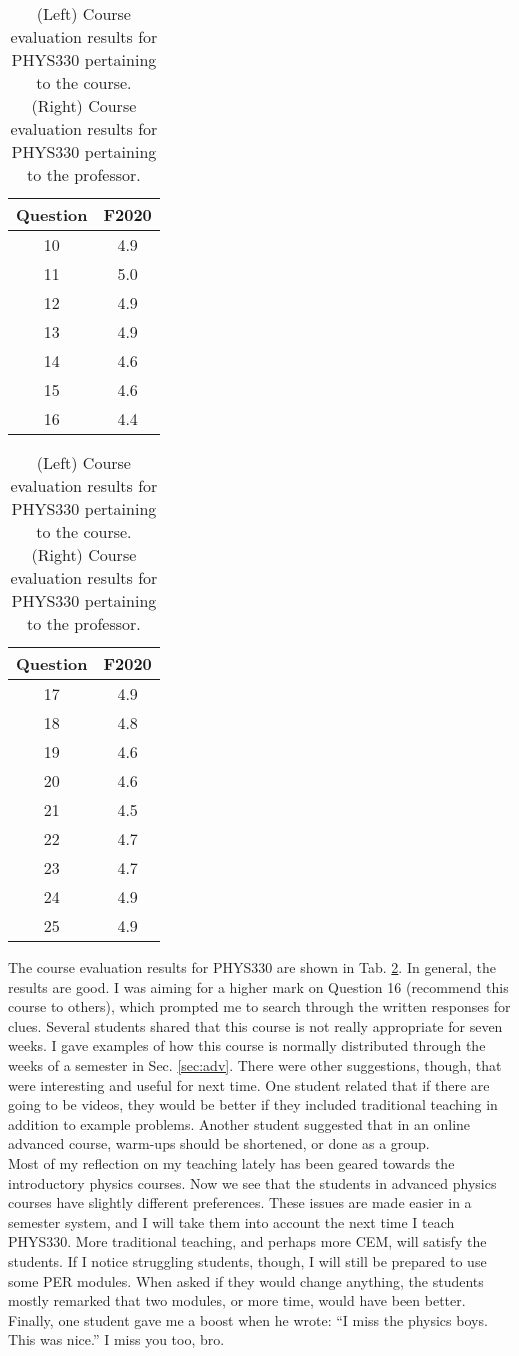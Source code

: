 \documentclass[../../main.tex]{subfiles}
\begin{document}
\begin{table}
\footnotesize
\centering
\begin{tabular}{| c | c |}
\hline
\hline
Question & F2020 \\ \hline
10 & 4.9 \\ \hline
11 & 5.0 \\ \hline
12 & 4.9 \\ \hline
13 & 4.9 \\ \hline
14 & 4.6 \\ \hline
15 & 4.6 \\ \hline
16 & 4.4 \\ \hline
\hline
\end{tabular}
\begin{tabular}{| c | c |}
\hline
\hline
Question & F2020 \\ \hline
17 & 4.9 \\ \hline
18 & 4.8 \\ \hline
19 & 4.6 \\ \hline
20 & 4.6 \\ \hline
21 & 4.5 \\ \hline
22 & 4.7 \\ \hline
23 & 4.7 \\ \hline
24 & 4.9 \\ \hline
25 & 4.9 \\ \hline
\hline
\end{tabular}
\caption{\label{tab:eval_330} (Left) Course evaluation results for PHYS330 pertaining to the course.  (Right) Course evaluation results for PHYS330 pertaining to the professor.}
\end{table}

The course evaluation results for PHYS330 are shown in Tab. \ref{tab:eval_330}.  In general, the results are good.  I was aiming for a higher mark on Question 16 (recommend this course to others), which prompted me to search through the written responses for clues. Several students shared that this course is not really appropriate for seven weeks.  I gave examples of how this course is normally distributed through the weeks of a semester in Sec. \ref{sec:adv}.  There were other suggestions, though, that were interesting and useful for next time.  One student related that if there are going to be videos, they would be better if they included traditional teaching in addition to example problems.  Another student suggested that in an online advanced course, warm-ups should be shortened, or done as a group.
\\
\vspace{0.25cm}
Most of my reflection on my teaching lately has been geared towards the introductory physics courses.  Now we see that the students in advanced physics courses have slightly different preferences.  These issues are made easier in a semester system, and I will take them into account the next time I teach PHYS330.  More traditional teaching, and perhaps more CEM, will satisfy the students.  If I notice struggling students, though, I will still be prepared to use some PER modules.  When asked if they would change anything, the students mostly remarked that two modules, or more time, would have been better.  Finally, one student gave me a boost when he wrote: ``I miss the physics boys.  This was nice.''  I miss you too, bro.
\end{document}
